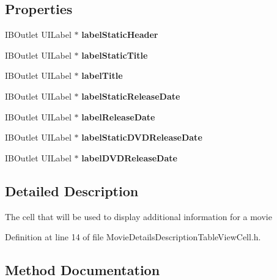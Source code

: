 \subsection*{Properties}
\begin{DoxyCompactItemize}
\item 
I\+B\+Outlet U\+I\+Label $\ast$ {\bfseries label\+Static\+Header}\label{interface_movie_details_description_table_view_cell_aca9a5231a1e6d9a2dbe79415a3fbfb79}

\item 
I\+B\+Outlet U\+I\+Label $\ast$ {\bfseries label\+Static\+Title}\label{interface_movie_details_description_table_view_cell_a413df6fe9663f439b4c4484cff8bd7be}

\item 
I\+B\+Outlet U\+I\+Label $\ast$ {\bfseries label\+Title}\label{interface_movie_details_description_table_view_cell_a276fe956196d3a274524598e0308887a}

\item 
I\+B\+Outlet U\+I\+Label $\ast$ {\bfseries label\+Static\+Release\+Date}\label{interface_movie_details_description_table_view_cell_a9ca7782a599f57db1066ad5adea6a4d4}

\item 
I\+B\+Outlet U\+I\+Label $\ast$ {\bfseries label\+Release\+Date}\label{interface_movie_details_description_table_view_cell_a0a6dcd247433b3baf7093ef9091205bd}

\item 
I\+B\+Outlet U\+I\+Label $\ast$ {\bfseries label\+Static\+D\+V\+D\+Release\+Date}\label{interface_movie_details_description_table_view_cell_aa1b8ca02fbfab3f7b9a30bd866f06bad}

\item 
I\+B\+Outlet U\+I\+Label $\ast$ {\bfseries label\+D\+V\+D\+Release\+Date}\label{interface_movie_details_description_table_view_cell_a3d6656e238fdf0278c8da5e375357fa5}

\end{DoxyCompactItemize}


\subsection{Detailed Description}
The cell that will be used to display additional information for a movie 

Definition at line 14 of file Movie\+Details\+Description\+Table\+View\+Cell.\+h.



\subsection{Method Documentation}
